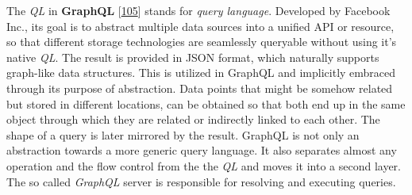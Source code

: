 \documentclass[12pt,english,a4paper,titlepage,cleardoublepage=empty,dottedtoc]{report}
\begin{document}
The \emph{QL} in \textbf{\protect\hypertarget{def--graphql}{}{GraphQL}}
{[}\protect\hyperlink{ref-web_spec_graphql}{105}{]} stands for
\emph{query language}. Developed by Facebook Inc., its goal is to
abstract multiple data sources into a unified API or resource, so that
different storage technologies are seamlessly queryable without using
it's native \emph{QL}. The result is provided in JSON format, which
naturally supports graph-like data structures. This is utilized in
GraphQL and implicitly embraced through its purpose of abstraction. Data
points that might be somehow related but stored in different locations,
can be obtained so that both end up in the same object through which
they are related or indirectly linked to each other. The shape of a
query is later mirrored by the result. GraphQL is not only an
abstraction towards a more generic query language. It also separates
almost any operation and the flow control from the the \emph{QL} and
moves it into a second layer. The so called \emph{GraphQL} server is
responsible for resolving and executing queries.
\end{document}
